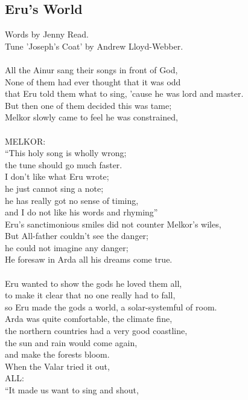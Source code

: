 \begin{multicols}{2}
\section{Eru’s World}
Words by Jenny Read.
\\
Tune ’Joseph’s Coat’ by Andrew Lloyd-Webber.
\\
\\
All the Ainur sang their songs in front of God,
\\
None of them had ever thought that it was odd
\\
that Eru told them what to sing, ’cause he was lord and master.
\\
But then one of them decided this was tame;
\\
Melkor slowly came to feel he was constrained,
\\
\\
MELKOR:
\\
“This holy song is wholly wrong;
\\
the tune should go much faster.
\\
I don’t like what Eru wrote;
\\
he just cannot sing a note;
\\
he has really got no sense of timing,
\\
and I do not like his words and rhyming”
\\
Eru’s sanctimonious smiles did not counter Melkor’s wiles,
\\
But All-father couldn’t see the danger;
\\
he could not imagine any danger;
\\
He foresaw in Arda all his dreams come true.
\\
\\
Eru wanted to show the gods he loved them all,
\\
to make it clear that no one really had to fall,
\\
so Eru made the gods a world, a solar-systemful of room.
\\
Arda was quite comfortable, the climate fine,
\\
the northern countries had a very good coastline,
\\
the sun and rain would come again,
\\
and make the forests bloom.
\\
When the Valar tried it out,
\\
ALL:
\\
“It made us want to sing and shout,

\end{multicols}
